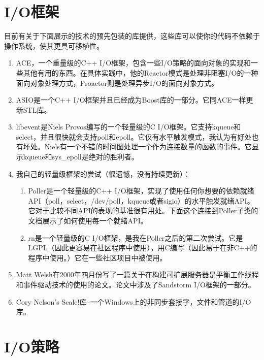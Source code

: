 \documentclass[12pt, twoside, a4paper, xetex]{report}
\begin{document}
\section*{I/O框架}
	目前有关于下面展示的技术的预先包装的库提供，这些库可以使你的代码不依赖于操作系统，使其更具可移植性。
	\begin{enumerate}
	
	\item ACE，一个重量级的C++ I/O框架，包含一些I/O策略的面向对象的实现和一些其他有用的东西。在具体实践中，他的Reactor模式是处理非阻塞I/O的一种面向对象处理方式，Proactor则是处理异步I/O的面向对象方式。
	\item ASIO是一个C++ I/O框架并且已经成为Boost库的一部分。它同ACE一样更新STL库。
	\item libevent是Niels Provos编写的一个轻量级的C I/O框架。它支持kqueue和select，并且很快就会支持poll和epoll。它仅有水平触发模式，我认为有好处也有坏处。Niels有一个不错的时间图处理一个作为连接数量的函数的事件。它显示kqueue和sys\_epoll是绝对的胜利者。
	\item 我自己的轻量级框架的尝试（很遗憾，没有持续更新）：
		\begin{enumerate}
		\item Poller是一个轻量级的C++ I/O框架，实现了使用任何你想要的依赖就绪API（poll，select，/dev/poll，kqueue或者sigio）的水平触发就绪API。它对于比较不同API的表现的基准很有用处。下面这个连接到Poller子类的文档展示了如何使用每一个就绪API。
		\item rn是一个轻量级的C I/O框架，是我在Poller之后的第二次尝试。它是LGPL（因此更容易在社区程序中使用），用C编写（因此易于在非C++的程序中使用。）它在一些社区项目中被使用。
		\end{enumerate}
	\item Matt Welsh在2000年四月份写了一篇关于在构建可扩展服务器是平衡工作线程和事件驱动技术的使用的论文。论文中涉及了Sandstorm I/O框架的一部分。
	\item Cory Nelson's Scale!库--一个Windows上的非同步套接字，文件和管道的I/O库。
	\end{enumerate}
	
\section*{I/O策略}
\end{document}
